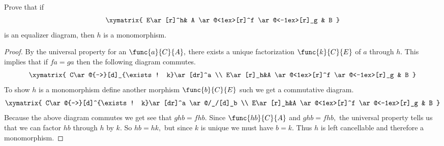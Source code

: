 \documentclass[../../main]{subfiles}
\begin{document}
\paragraph{}
\begin{exercise}
	Prove that if
	$$
	\xymatrix{
		E\ar[r]^h&
		A  \ar@<1ex>[r]^f
		\ar@<-1ex>[r]_g
		& B  }
	$$
	is an equalizer diagram, then $ h $ is a monomorphism.
\end{exercise}
\begin{proof}
	By the universal property for an $ \func{a}{C}{A},$ there exists a unique
	factorization $ \func{k}{C}{E} $ of $ a $ through $ h. $ This implies that if $ fa=ga $ then the following diagram commutes.
	$$
	\xymatrix{
		C\ar@{-->}[d]_{\exists! k}\ar[dr]^a  \\
		E\ar[r]_h&A  \ar@<1ex>[r]^f
		\ar@<-1ex>[r]_g
		& B }
	$$
	To show $ h $ is a monomorphism define another morphism $\func{b}{C}{E} $
	such we get a commutative diagram.
	$$
	\xymatrix{
		C\ar@{-->}[d]^{\exists! k}\ar[dr]^a \ar@/_/[d]_b  \\
		E\ar[r]_h&A  \ar@<1ex>[r]^f
		\ar@<-1ex>[r]_g
		& B }
	$$
	Because the above diagram commutes we get see that $ ghb=fhb. $ Since $ 
	\func{hb}{C}{A} $ and $ ghb=fhb, $ the universal property tells us that we 
	can factor $ hb $ through $ h $ by $ k. $ So $ hb=hk, $ but since $ k $ is 
	unique we must have $ b=k. $ Thus $ h $ is left cancellable and therefore a 
	monomorphism.
	
\end{proof}
\end{document}
